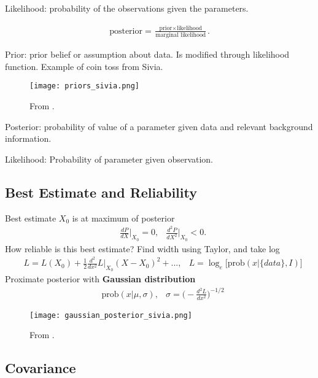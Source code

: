 \documentclass[twoside,english]{uiofysmaster}
\begin{document}
Likelihood: probability of the observations given the parameters.

\begin{align}
\text{posterior} = \frac{\text{prior} \times \text{likelihood}}{\text{marginal likelihood}}.
\end{align}

Prior: prior belief or assumption about data. Is modified through likelihood function. Example of coin toss from Sivia.

\begin{figure}
\centering
\texttt{[image: priors\_sivia.png]}
\caption{From \cite{sivia2006data}.}
\end{figure}

Posterior: probability of value of a parameter given data and relevant background information.

Likelihood: Probability of parameter given observation.

\subsection{Best Estimate and Reliability}

Best estimate $X_0$ is at maximum of posterior
\begin{align}
&\frac{dP}{dX}\Big|_{X_0} = 0, &\frac{d^2P}{dX^2}\Big|_{X_0} < 0.
\end{align}
How reliable is this best estimate? Find width using Taylor, and take log
\begin{align}
&L = L(X_0) + \frac{1}{2} \frac{d^2}{dx^2} L\Big|_{X_0} (X-X_0)^2 +... ,&L = \log_e \Big[\text{prob}(x | \{data\}, I) \Big]
\end{align}
Proximate posterior with \textbf{Gaussian distribution}
\begin{align}
&\text{prob}(x| \mu, \sigma), &\sigma = \Big( - \frac{d^2L}{dx^2} \Big)^{-1/2}
\end{align}

\begin{figure}
\centering
\texttt{[image: gaussian\_posterior\_sivia.png]}
\caption{From \cite{sivia2006data}.}
\end{figure}

\subsection{Covariance}
\end{document}
